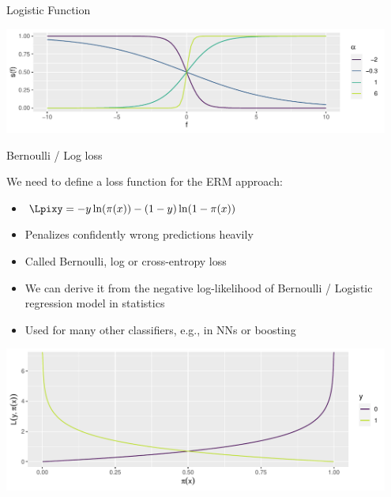 \documentclass[11pt,compress,t,notes=noshow, xcolor=table]{beamer}
\newenvironment{knitrout}{}{} %
\begin{document}
\begin{vbframe}{Logistic Function}
\begin{knitrout}
{\centering \includegraphics[width=0.95\textwidth]{figure/reg_class_log_3} 

}



\end{knitrout}

\end{vbframe}

\begin{vbframe}{Bernoulli / Log loss}

We need to define a loss function for the ERM approach:

\begin{itemize}
  \item $\Lpixy = -y\ln(\pix)-(1-y)\ln(1-\pix)$
  \item Penalizes confidently wrong predictions heavily
  \item Called Bernoulli, log or cross-entropy loss 
  \item We can derive it from the negative log-likelihood of Bernoulli / Logistic regression model in statistics
  \item Used for many other classifiers, e.g., in NNs or boosting 
\end{itemize}


\begin{knitrout}\scriptsize
{}\color{fgcolor}

{\centering \includegraphics[width=0.95\textwidth]{figure/reg_class_log_4}  

}



\end{knitrout}

\end{vbframe}
\end{document}

